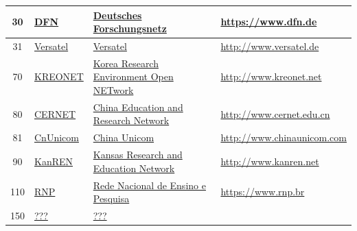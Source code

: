 \begin{small}
\begin{center}
\begin{longtable}{|c|c|c|c|}
 30 & \multicolumn{1}{|l|}{\index{DFN|see{Deutsches Forschungsnetz}}\index{Provider!Deutsches Forschungsnetz}\href{https://www.dfn.de}{DFN}} & \multicolumn{1}{|l|}{\index{Deutsches Forschungsnetz}\href{https://www.dfn.de}{Deutsches Forschungsnetz}} & \multicolumn{1}{|l|}{\tiny{\url{https://www.dfn.de}}} \\ \hline
 31 & \multicolumn{1}{|l|}{\index{Versatel}\index{Provider!Versatel}\href{http://www.versatel.de}{Versatel}} & \multicolumn{1}{|l|}{\index{Versatel}\href{http://www.versatel.de}{Versatel}} & \multicolumn{1}{|l|}{\tiny{\url{http://www.versatel.de}}} \\ \hline
 70 & \multicolumn{1}{|l|}{\index{KREONET|see{Korea Research Environment Open NETwork}}\index{Provider!Korea Research Environment Open NETwork}\href{http://www.kreonet.net}{KREONET}} & \multicolumn{1}{|l|}{\index{Korea Research Environment Open NETwork}\href{http://www.kreonet.net}{Korea Research Environment Open NETwork}} & \multicolumn{1}{|l|}{\tiny{\url{http://www.kreonet.net}}} \\ \hline
 80 & \multicolumn{1}{|l|}{\index{CERNET|see{China Education and Research Network}}\index{Provider!China Education and Research Network}\href{http://www.cernet.edu.cn}{CERNET}} & \multicolumn{1}{|l|}{\index{China Education and Research Network}\href{http://www.cernet.edu.cn}{China Education and Research Network}} & \multicolumn{1}{|l|}{\tiny{\url{http://www.cernet.edu.cn}}} \\ \hline
 81 & \multicolumn{1}{|l|}{\index{CnUnicom|see{China Unicom}}\index{Provider!China Unicom}\href{http://www.chinaunicom.com}{CnUnicom}} & \multicolumn{1}{|l|}{\index{China Unicom}\href{http://www.chinaunicom.com}{China Unicom}} & \multicolumn{1}{|l|}{\tiny{\url{http://www.chinaunicom.com}}} \\ \hline
 90 & \multicolumn{1}{|l|}{\index{KanREN|see{Kansas Research and Education Network}}\index{Provider!Kansas Research and Education Network}\href{http://www.kanren.net}{KanREN}} & \multicolumn{1}{|l|}{\index{Kansas Research and Education Network}\href{http://www.kanren.net}{Kansas Research and Education Network}} & \multicolumn{1}{|l|}{\tiny{\url{http://www.kanren.net}}} \\ \hline
 110 & \multicolumn{1}{|l|}{\index{RNP|see{Rede Nacional de Ensino e Pesquisa}}\index{Provider!Rede Nacional de Ensino e Pesquisa}\href{https://www.rnp.br}{RNP}} & \multicolumn{1}{|l|}{\index{Rede Nacional de Ensino e Pesquisa}\href{https://www.rnp.br}{Rede Nacional de Ensino e Pesquisa}} & \multicolumn{1}{|l|}{\tiny{\url{https://www.rnp.br}}} \\ \hline
 150 & \multicolumn{1}{|l|}{\index{???}\index{Provider!???}\href{}{???}} & \multicolumn{1}{|l|}{\index{???}\href{}{???}} & \multicolumn{1}{|l|}{\tiny{\url{}}} \\ \hline
\end{longtable}
\end{center}
\end{small}




